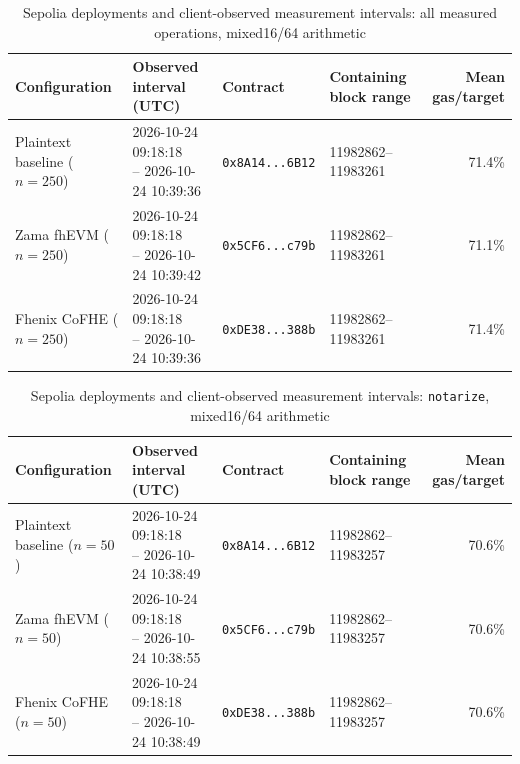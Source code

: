 \begin{table}[!t]
\caption{Sepolia deployments and client-observed measurement intervals: all measured operations, mixed16/64 arithmetic}
\label{tab:sepolia-client-intervals-reference-mixed-oct24-overall}
\centering
\footnotesize
\setlength{\tabcolsep}{4pt}
\begin{tabular}{|l|l|l|l|r|}
\hline
\textbf{Configuration} &
\textbf{Observed interval (UTC)} &
\textbf{Contract} &
\textbf{Containing block range} &
\textbf{Mean gas/target} \\
\hline
Plaintext baseline (\(n=250\)) &
\shortstack[l]{2026-10-24 09:18:18 \\ -- 2026-10-24 10:39:36} &
\texttt{0x8A14...6B12} &
11982862--11983261 &
71.4\% \\
\hline
Zama fhEVM (\(n=250\)) &
\shortstack[l]{2026-10-24 09:18:18 \\ -- 2026-10-24 10:39:42} &
\texttt{0x5CF6...c79b} &
11982862--11983261 &
71.1\% \\
\hline
Fhenix CoFHE (\(n=250\)) &
\shortstack[l]{2026-10-24 09:18:18 \\ -- 2026-10-24 10:39:36} &
\texttt{0xDE38...388b} &
11982862--11983261 &
71.4\% \\
\hline
\end{tabular}
\end{table}

\begin{table}[!t]
\caption{Sepolia deployments and client-observed measurement intervals: \texttt{notarize}, mixed16/64 arithmetic}
\label{tab:sepolia-client-intervals-reference-mixed-oct24-notarize}
\centering
\footnotesize
\setlength{\tabcolsep}{4pt}
\begin{tabular}{|l|l|l|l|r|}
\hline
\textbf{Configuration} &
\textbf{Observed interval (UTC)} &
\textbf{Contract} &
\textbf{Containing block range} &
\textbf{Mean gas/target} \\
\hline
Plaintext baseline (\(n=50\)) &
\shortstack[l]{2026-10-24 09:18:18 \\ -- 2026-10-24 10:38:49} &
\texttt{0x8A14...6B12} &
11982862--11983257 &
70.6\% \\
\hline
Zama fhEVM (\(n=50\)) &
\shortstack[l]{2026-10-24 09:18:18 \\ -- 2026-10-24 10:38:55} &
\texttt{0x5CF6...c79b} &
11982862--11983257 &
70.6\% \\
\hline
Fhenix CoFHE (\(n=50\)) &
\shortstack[l]{2026-10-24 09:18:18 \\ -- 2026-10-24 10:38:49} &
\texttt{0xDE38...388b} &
11982862--11983257 &
70.6\% \\
\hline
\end{tabular}
\end{table}

